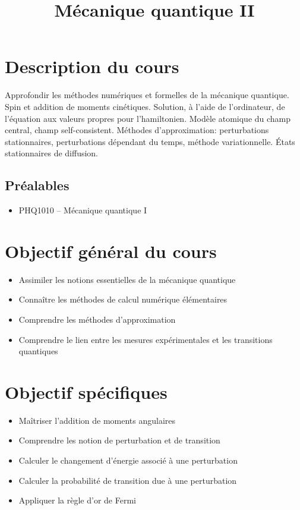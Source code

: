\documentclass[12pt,undergraduate]{uqtrplandecours}
\title{Mécanique quantique II}
\begin{document}
\maketitle

\section{Description du cours}

Approfondir les méthodes numériques et formelles de la mécanique quantique.
Spin et addition de moments cinétiques. Solution, à l'aide de l'ordinateur,
  de l'équation aux valeurs propres pour l'hamiltonien.
Modèle atomique du champ central, champ self-consistent.
Méthodes d'approximation: perturbations stationnaires,
  perturbations dépendant du temps, méthode variationnelle.
États stationnaires de diffusion. 


\subsection*{Préalables}
\begin{itemize}
  \item PHQ1010 -- Mécanique quantique I
\end{itemize}



\section{Objectif général du cours}

\begin{itemize}
  \item Assimiler les notions essentielles de la mécanique quantique
  \item Connaître les méthodes de calcul numérique élémentaires
  \item Comprendre les méthodes d'approximation
  \item Comprendre le lien entre les mesures expérimentales
        et les transitions quantiques
\end{itemize}


\section{Objectif spécifiques}

\begin{itemize}
  \item Maîtriser l'addition de moments angulaires
  \item Comprendre les notion de perturbation et de transition
  \item Calculer le changement d'énergie associé à une perturbation
  \item Calculer la probabilité de transition due à une perturbation
  \item Appliquer la règle d'or de Fermi
\end{itemize}
\end{document}
